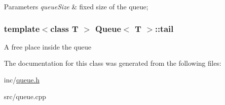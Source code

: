 \begin{DoxyParams}{Parameters}
{\em queue\+Size} & fixed size of the queue; \\
\hline
\end{DoxyParams}
\hypertarget{class_queue_a1e772a8071d79b71c433a78f10c4bf3e}{}
\subsubsection[{tail}]{\setlength{\rightskip}{0pt plus 5cm}template$<$class T $>$ {\bf Queue}$<$ T $>$\+::tail\hspace{0.3cm}{\ttfamily [private]}}\label{class_queue_a1e772a8071d79b71c433a78f10c4bf3e}
A free place inside the queue 

The documentation for this class was generated from the following files\+:\begin{DoxyCompactItemize}
\item 
inc/\hyperlink{queue_8h}{queue.\+h}\item 
src/queue.\+cpp\end{DoxyCompactItemize}
